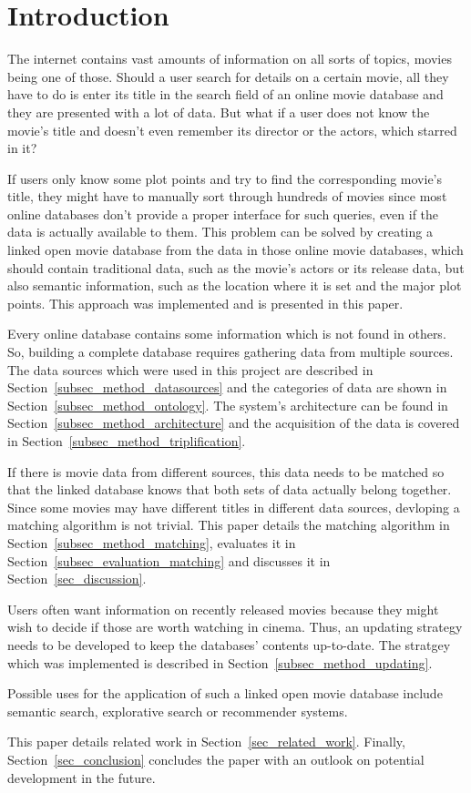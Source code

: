\section{Introduction}
\label{sec_introduction}

The internet contains vast amounts of information on all sorts of topics, movies being one of those.
Should a user search for details on a certain movie, all they have to do is enter its title in the search field of an online movie database and they are presented with a lot of data.
But what if a user does not know the movie's title and doesn't even remember its director or the actors, which starred in it?

If users only know some plot points and try to find the corresponding movie's title, they might have to manually sort through hundreds of movies since most online databases don't provide a proper interface for such queries, even if the data is actually available to them.
This problem can be solved by creating a linked open movie database from the data in those online movie databases, which should contain traditional data, such as the movie's actors or its release data, but also semantic information, such as the location where it is set and the major plot points.
This approach was implemented and is presented in this paper.

Every online database contains some information which is not found in others.
So, building a complete database requires gathering data from multiple sources.
The data sources which were used in this project are described in Section~\ref{subsec_method_datasources} and the categories of data are shown in Section~\ref{subsec_method_ontology}.
The system's architecture can be found in Section~\ref{subsec_method_architecture} and the acquisition of the data is covered in Section~\ref{subsec_method_triplification}.

If there is movie data from different sources, this data needs to be matched so that the linked database knows that both sets of data actually belong together.
Since some movies may have different titles in different data sources, devloping a matching algorithm is not trivial.
This paper details the matching algorithm in Section~\ref{subsec_method_matching}, evaluates it in Section~\ref{subsec_evaluation_matching} and discusses it in Section~\ref{sec_discussion}.

Users often want information on recently released movies because they might wish to decide if those are worth watching in cinema.
Thus, an updating strategy needs to be developed to keep the databases' contents up-to-date.
The stratgey which was implemented is described in Section~\ref{subsec_method_updating}.

Possible uses for the application of such a linked open movie database include semantic search, explorative search or recommender systems.

This paper details related work in Section~\ref{sec_related_work}.
Finally, Section~\ref{sec_conclusion} concludes the paper with an outlook on potential development in the future.
